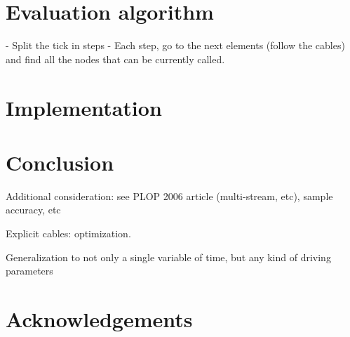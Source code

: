 \documentclass{article}
\begin{document}
\section{Evaluation algorithm}
- Split the tick in steps
- Each step, go to the next elements (follow the cables) and find all the nodes that can be currently called.
    
    
\section{Implementation}
\section{Conclusion}
Additional consideration: see PLOP 2006 article (multi-stream, etc), sample accuracy, etc
    
Explicit cables: optimization.

Generalization to not only a single variable of time, but any kind of driving parameters
\section{Acknowledgements}
\printbibliography 
\end{document}

